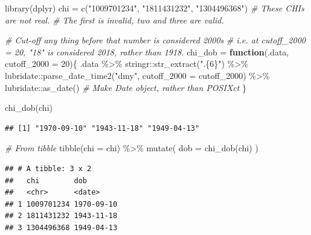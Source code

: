 \documentclass[
]{book}
\newenvironment{Shaded}{\begin{snugshade}}{\end{snugshade}}
\newcommand{\AttributeTok}[1]{\textcolor[rgb]{0.77,0.63,0.00}{#1}}
\newcommand{\CommentTok}[1]{\textcolor[rgb]{0.56,0.35,0.01}{\textit{#1}}}
\newcommand{\ControlFlowTok}[1]{\textcolor[rgb]{0.13,0.29,0.53}{\textbf{#1}}}
\newcommand{\DecValTok}[1]{\textcolor[rgb]{0.00,0.00,0.81}{#1}}
\newcommand{\FunctionTok}[1]{\textcolor[rgb]{0.00,0.00,0.00}{#1}}
\newcommand{\NormalTok}[1]{#1}
\newcommand{\OtherTok}[1]{\textcolor[rgb]{0.56,0.35,0.01}{#1}}
\newcommand{\SpecialCharTok}[1]{\textcolor[rgb]{0.00,0.00,0.00}{#1}}
\newcommand{\StringTok}[1]{\textcolor[rgb]{0.31,0.60,0.02}{#1}}
\begin{document}
\begin{Shaded}
\begin{Highlighting}[]
\FunctionTok{library}\NormalTok{(dplyr)}
\NormalTok{chi }\OtherTok{=} \FunctionTok{c}\NormalTok{(}\StringTok{"1009701234"}\NormalTok{, }\StringTok{"1811431232"}\NormalTok{, }\StringTok{"1304496368"}\NormalTok{)}
\CommentTok{\# These CHIs are not real. }
\CommentTok{\# The first is invalid, two and three are valid. }

\CommentTok{\# Cut{-}off any thing before that number is considered 2000s}
\CommentTok{\# i.e. at cutoff\_2000 = 20, "18" is considered 2018, rather than 1918. }
\NormalTok{chi\_dob }\OtherTok{=} \ControlFlowTok{function}\NormalTok{(.data, }\AttributeTok{cutoff\_2000 =} \DecValTok{20}\NormalTok{)\{}
\NormalTok{  .data }\SpecialCharTok{\%\textgreater{}\%} 
\NormalTok{    stringr}\SpecialCharTok{::}\FunctionTok{str\_extract}\NormalTok{(}\StringTok{".\{6\}"}\NormalTok{) }\SpecialCharTok{\%\textgreater{}\%} 
\NormalTok{    lubridate}\SpecialCharTok{::}\FunctionTok{parse\_date\_time2}\NormalTok{(}\StringTok{"dmy"}\NormalTok{, }\AttributeTok{cutoff\_2000 =}\NormalTok{ cutoff\_2000) }\SpecialCharTok{\%\textgreater{}\%} 
\NormalTok{    lubridate}\SpecialCharTok{::}\FunctionTok{as\_date}\NormalTok{() }\CommentTok{\# Make Date object, rather than POSIXct}
\NormalTok{\}}

\FunctionTok{chi\_dob}\NormalTok{(chi)}
\end{Highlighting}
\end{Shaded}

\begin{verbatim}
## [1] "1970-09-10" "1943-11-18" "1949-04-13"
\end{verbatim}

\begin{Shaded}
\begin{Highlighting}[]
\CommentTok{\# From tibble}
\FunctionTok{tibble}\NormalTok{(}\AttributeTok{chi =}\NormalTok{ chi) }\SpecialCharTok{\%\textgreater{}\%} 
  \FunctionTok{mutate}\NormalTok{(}
    \AttributeTok{dob =} \FunctionTok{chi\_dob}\NormalTok{(chi)}
\NormalTok{  )}
\end{Highlighting}
\end{Shaded}

\begin{verbatim}
## # A tibble: 3 x 2
##   chi        dob       
##   <chr>      <date>    
## 1 1009701234 1970-09-10
## 2 1811431232 1943-11-18
## 3 1304496368 1949-04-13
\end{verbatim}
\end{document}

